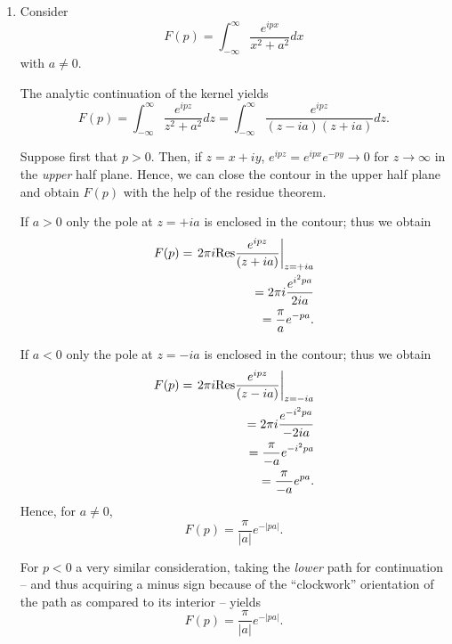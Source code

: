 {\begin{enumerate}
\item  Consider   $$F(p)=\int_{-\infty}^{\infty}\frac{ e^{ipx}}{x^2+a^2} dx$$ with $a\neq 0$.

The analytic continuation of the kernel yields
$$F(p)=\int_{-\infty}^{\infty}\frac{ e^{ipz}}{z^2+a^2} dz
=  \int_{-\infty}^{\infty}\frac{ e^{ipz}}{(z-ia)(z+ia)} dz
.$$

Suppose first that $p>0$. Then, if $z=x+iy$,  $e^{ipz}=e^{ipx}e^{-py}\rightarrow 0$
for $z \rightarrow \infty $
in the {\em upper} half plane.
Hence,  we can close the contour in the upper half plane and obtain  $F(p)$
with the help of the residue theorem.

If $a>0$ only the pole at $z=+ia$ is enclosed in the contour; thus we obtain
\begin{equation}
\begin{split}
F(p) =\left.  2\pi i  {\rm Res} \frac{ e^{ipz}}{(z+ia)} \right|_{z=+ia} \\
\quad      =  2\pi i   \frac{e^{i^2 pa}}{2ia} \\
\quad      =  \frac{\pi}{a}    e^{- pa}.
\end{split}
\end{equation}

If $a<0$ only the pole at $z=-ia$ is enclosed in the contour; thus we obtain
\begin{equation}
\begin{split}
F(p) =\left.  2\pi i  {\rm Res} \frac{ e^{ipz}}{(z-ia)} \right|_{z=-ia} \\
\quad      =  2\pi i   \frac{e^{-i^2 pa}}{-2ia} \\
\quad      =  \frac{\pi}{-a}    e^{-i^2 pa} \\
\quad      =  \frac{\pi}{-a}    e^{ pa}
.
\end{split}
\end{equation}
Hence, for $a\neq 0$,
\begin{equation}
F(p) =  \frac{\pi}{\vert a\vert }    e^{ -\vert p a\vert}.
\end{equation}

For $p<0$ a very similar consideration, taking the {\em lower} path for continuation --
and thus acquiring a minus sign because of the ``clockwork''
orientation of the path as compared to its interior --
yields
\begin{equation}
F(p) =  \frac{\pi}{\vert a\vert }    e^{  - \vert pa\vert }.
\end{equation}



\end{enumerate}}
